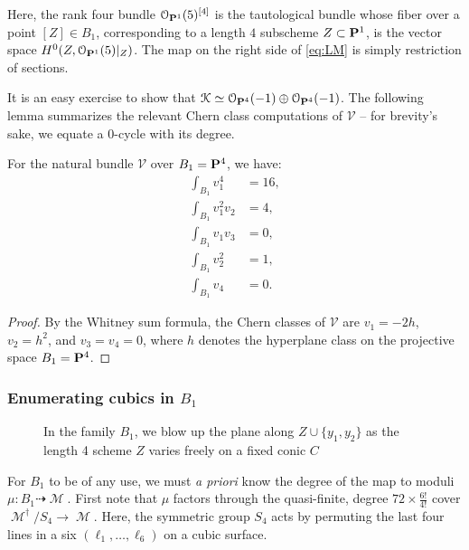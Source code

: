 \documentclass[12pt,reqno]{amsart}
\DeclareMathOperator{\M}{\mathcal{M}}
\renewcommand{\to}{{\longrightarrow}}
\numberwithin{equation}{section}
\renewcommand{\O}{\mathcal O}
\newcommand{\V}{\mathcal V}
\begin{document}
Here, the rank four bundle $\O_{\P^{1}}(5)^{[4]}$ is the tautological
bundle whose fiber over a point $[Z] \in B_{1}$, corresponding to a
length $4$ subscheme $Z \subset \P^{1}$, is the vector space
$H^{0}(Z, \O_{\P^{1}}(5)|_{Z})$.  The map on the right side of
\eqref{eq:LM} is simply restriction of sections.

It is an easy exercise to show that
$\mathcal{K} \simeq \O_{\P^{4}}(-1) \oplus \O_{\P^{4}}(-1)$.  The
following lemma summarizes the relevant Chern class computations of
$\V$ -- for brevity's sake, we equate a $0$-cycle with its degree.

\begin{lemma}
  \label{lemma:chernB1}
  For the natural bundle $\V$ over $B_1= \P^{4}$, we have:
  \begin{align}\nonumber
    \int_{B_{1}}v_{1}^{4} &= 16,\\\nonumber
    \int_{B_{1}}v_{1}^{2}v_{2} &= 4,\\\nonumber
    \int_{B_{1}}v_{1}v_{3} &=0,\\\nonumber
    \int_{B_{1}}v_2^{2} &= 1,\\\nonumber
    \int_{B_{1}}v_{4} &= 0.
  \end{align}
\end{lemma}

\begin{proof}
  By the Whitney sum formula, the Chern classes of $\V$ are
  $v_{1} = -2h$, $v_{2}=h^2$, and $v_{3}= v_{4}=0$, where $h$ denotes
  the hyperplane class on the projective space $B_1 = \P^{4}$.
\end{proof}









\subsubsection{Enumerating cubics in $B_1$}
\label{sec:enum-cubics-b_1}


\begin{figure}
  \centering
  
  \caption{In the family $B_1$, we blow up the plane along $Z \cup \{y_1, y_2\}$ as the length 4 scheme $Z$ varies freely on a fixed conic $C$}
  \label{fig:FamilyB1}
\end{figure}


For $B_1$ to be of any use, we must {\sl a priori} know the degree of
the map to moduli $\mu: B_1 \dashrightarrow \M$.  First note that
$\mu$ factors through the quasi-finite, degree
$72 \times \frac{6!}{4!}$ cover $\M^{\dagger}/S_{4} \to \M$.  Here,
the symmetric group $S_4$ acts by permuting the last four lines in a
six $(\ell_{1}, \dots, \ell_{6})$ on a cubic surface.
\end{document}
